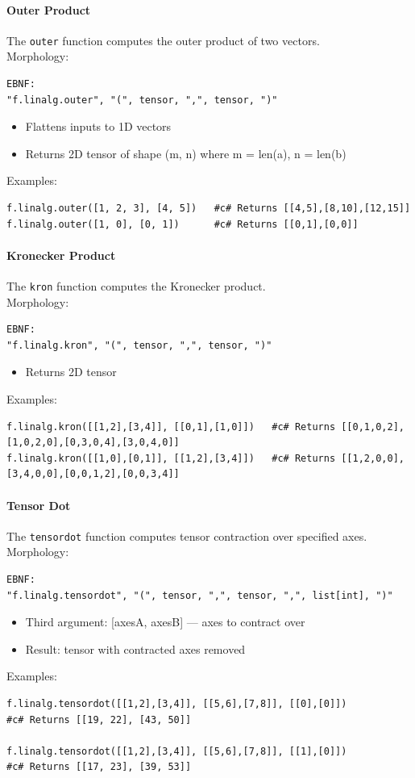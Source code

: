 \paragraph{Outer Product}
The \texttt{outer} function computes the outer product of two vectors.\\
Morphology:
\begin{verbatim}
EBNF:
"f.linalg.outer", "(", tensor, ",", tensor, ")"
\end{verbatim}
\begin{itemize}
\item Flattens inputs to 1D vectors
\item Returns 2D tensor of shape (m, n) where m = len(a), n = len(b)
\end{itemize}
Examples:
\begin{verbatim}
f.linalg.outer([1, 2, 3], [4, 5])   #c# Returns [[4,5],[8,10],[12,15]]
f.linalg.outer([1, 0], [0, 1])      #c# Returns [[0,1],[0,0]]
\end{verbatim}

\paragraph{Kronecker Product}
The \texttt{kron} function computes the Kronecker product.\\
Morphology:
\begin{verbatim}
EBNF:
"f.linalg.kron", "(", tensor, ",", tensor, ")"
\end{verbatim}
\begin{itemize}
\item Returns 2D tensor
\end{itemize}
Examples:
\begin{verbatim}
f.linalg.kron([[1,2],[3,4]], [[0,1],[1,0]])   #c# Returns [[0,1,0,2],[1,0,2,0],[0,3,0,4],[3,0,4,0]]
f.linalg.kron([[1,0],[0,1]], [[1,2],[3,4]])   #c# Returns [[1,2,0,0],[3,4,0,0],[0,0,1,2],[0,0,3,4]]
\end{verbatim}

\paragraph{Tensor Dot}
The \texttt{tensordot} function computes tensor contraction over specified axes.\\
Morphology:
\begin{verbatim}
EBNF:
"f.linalg.tensordot", "(", tensor, ",", tensor, ",", list[int], ")"
\end{verbatim}
\begin{itemize}
\item Third argument: [axesA, axesB] — axes to contract over
\item Result: tensor with contracted axes removed
\end{itemize}
Examples:
\begin{verbatim}
f.linalg.tensordot([[1,2],[3,4]], [[5,6],[7,8]], [[0],[0]])
#c# Returns [[19, 22], [43, 50]]

f.linalg.tensordot([[1,2],[3,4]], [[5,6],[7,8]], [[1],[0]])
#c# Returns [[17, 23], [39, 53]]
\end{verbatim}

